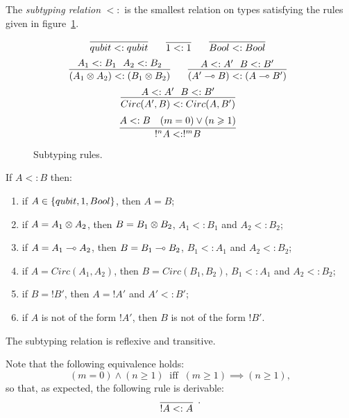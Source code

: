 \documentclass{article}
\begin{document}
\begin{definition}
The \emph{subtyping relation} $<:$ is the smallest relation on 
types satisfying the rules given in 
figure~\hyperref[subtyping_congruences]{\ref*{subtyping_congruences}}.
\end{definition}

\begin{figure}[!ht]
\begin{mdframed}
\[
  \infer[]{qubit <: qubit}{}
~~~~
  \infer[]{1 <: 1}{}
~~~~
  \infer[]{Bool <: Bool}{}
\]
\[
  \infer[]{ (A_1\x A_2) <:  (B_1 \x B_2)}{A_1<:B_1~~A_2<:B_2}
~~~~
  \infer[]{ (A'\loli B) <: (A\loli B')}{A<:A'~~B<:B'}
\]
\[
  \infer[]{ Circ(A', B) <:  Circ(A, B')}{A<:A'~~B<:B'}
\]
\[
  \infer[]{ !^nA <: !^mB}{
    A<:B
    &
    (m=0)\vee (n\geq 1)
  }
\]
%
\end{mdframed}
\caption{Subtyping rules.}
\label{subtyping_congruences}
\end{figure}

\begin{remark}
\label{subtyping_shape}
If $A<:B$ then:
\begin{enumerate}
  \item if $A\in\{qubit, 1, Bool\}$, then $A=B$;
  \item if $A=A_1\otimes A_2$, then $B=B_1\otimes B_2$, 
  $A_1<:B_1$ and $A_2<:B_2$;
  \item if $A=A_1\multimap A_2$, then $B=B_1\multimap B_2$, 
  $B_1<:A_1$ and $A_2<:B_2$;
  \item if $A=Circ(A_1, A_2)$, then $B=Circ(B_1,B_2)$, 
  $B_1<:A_1$ and $A_2<:B_2$;
  \item if $B=!B'$, then $A=!A'$ and $A'<:B'$;\label{subtype_bang}
  \item if $A$ is not of the form $!A'$, then $B$ is not 
  of the form $!B'$.
\end{enumerate}
\end{remark}

\begin{proposition}
The subtyping relation is reflexive and transitive.
\end{proposition}

Note that the following equivalence holds: 
\[
(m=0)\wedge (n\geq 1) 
~\mbox{ iff }~ 
(m\geq 1) \implies (n\geq 1),
\]
so that, as expected, the following rule is derivable:
\[
  \infer[.]{!A <: A}{}
\]
\end{document}
